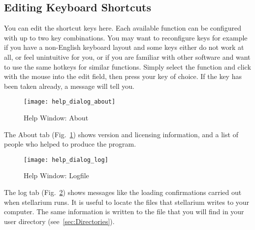\subsection{Editing Keyboard Shortcuts}
\label{sec:gui:help:hotkeys}

You can edit the shortcut keys here. Each available function can be
configured with up to two key combinations. You may want to
reconfigure keys for example if you have a non-English keyboard layout
and some keys either do not work at all, or feel unintuitive for you,
or if you are familiar with other software and want to use the same
hotkeys for similar functions. Simply select the function and click
with the mouse into the edit field, then press your key of choice. If
the key has been taken already, a message will tell you.


\begin{figure}[htbp]
\centering\texttt{[image: help\_dialog\_about]}
\caption{Help Window: About}
\label{fig:gui:help:about}
\end{figure}

The About tab (Fig.~\ref{fig:gui:help:about}) shows version and licensing information, and a list
of people who helped to produce the program.

\begin{figure}[htbp]
\centering\texttt{[image: help\_dialog\_log]}
\caption{Help Window: Logfile}
\label{fig:gui:help:log}
\end{figure}

The log tab (Fig.~\ref{fig:gui:help:log}) shows messages like the loading confirmations carried out when
stellarium runs. It is useful to locate the files that stellarium writes
to your computer. The same information is written to  the file  that you will
find in your user directory (see~\ref{sec:Directories}).




